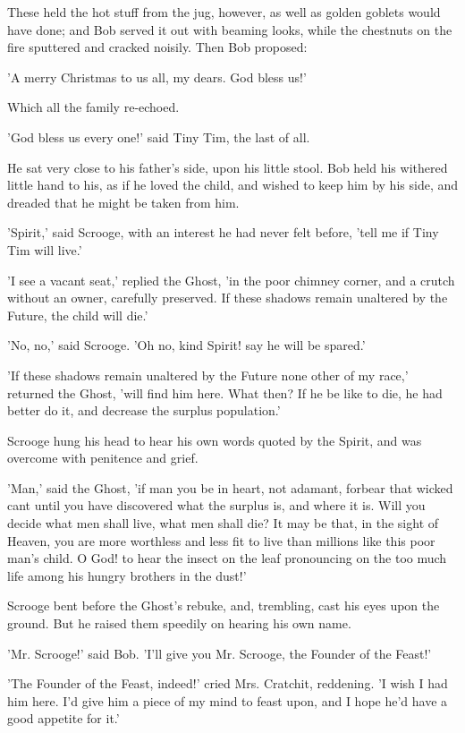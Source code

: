 These held the hot stuff from the jug, however, as well as golden
goblets would have done; and Bob served it out with beaming looks, while
the chestnuts on the fire sputtered and cracked noisily. Then Bob
proposed:

'A merry Christmas to us all, my dears. God bless us!'

Which all the family re-echoed.

'God bless us every one!' said Tiny Tim, the last of all.

He sat very close to his father's side, upon his little stool. Bob held
his withered little hand to his, as if he loved the child, and wished to
keep him by his side, and dreaded that he might be taken from him.

'Spirit,' said Scrooge, with an interest he had never felt before, 'tell
me if Tiny Tim will live.'

'I see a vacant seat,' replied the Ghost, 'in the poor chimney corner,
and a crutch without an owner, carefully preserved. If these shadows
remain unaltered by the Future, the child will die.'

'No, no,' said Scrooge. 'Oh no, kind Spirit! say he will be spared.'

'If these shadows remain unaltered by the Future none other of my race,'
returned the Ghost, 'will find him here. What then? If he be like to
die, he had better do it, and decrease the surplus population.'

Scrooge hung his head to hear his own words quoted by the Spirit, and
was overcome with penitence and grief.

'Man,' said the Ghost, 'if man you be in heart, not adamant, forbear
that wicked cant until you have discovered what the surplus is, and
where it is. Will you decide what men shall live, what men shall die? It
may be that, in the sight of Heaven, you are more worthless and less fit
to live than millions like this poor man's child. O God! to hear the
insect on the leaf pronouncing on the too much life among his hungry
brothers in the dust!'

Scrooge bent before the Ghost's rebuke, and, trembling, cast his eyes
upon the ground. But he raised them speedily on hearing his own name.

'Mr. Scrooge!' said Bob. 'I'll give you Mr. Scrooge, the Founder of the
Feast!'

'The Founder of the Feast, indeed!' cried Mrs. Cratchit, reddening. 'I
wish I had him here. I'd give him a piece of my mind to feast upon, and
I hope he'd have a good appetite for it.'

